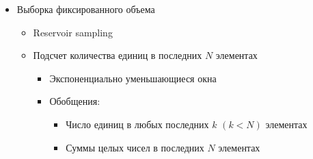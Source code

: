 \documentclass[landscape]{slides}
\begin{document}
\begin{normalsize}
\begin{slide}
\begin{itemize}
\item Выборка фиксированного объема

  \begin{itemize}
  \item Reservoir sampling

  \item Подсчет количества единиц в последних $N$ элементах

  \begin{itemize}
  \item Экспоненциально уменьшающиеся окна

  \item Обобщения:

    \begin{itemize}
    \item Число единиц в любых последних $k$ $(k < N)$ элементах

    \item Суммы целых чисел в последних $N$ элементах
    \end{itemize}
  \end{itemize}
  \end{itemize}
\end{itemize}

\end{slide}


\end{normalsize}
\end{document}
